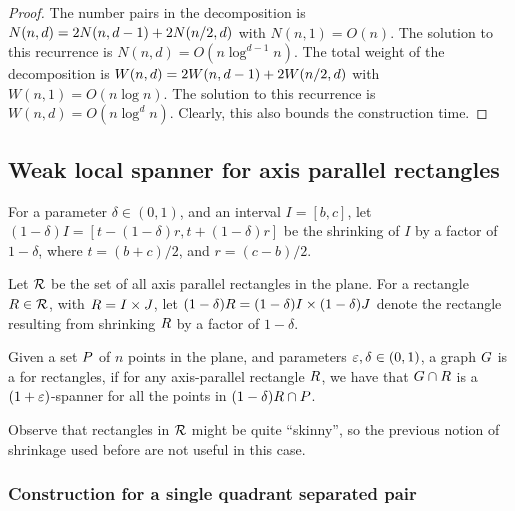 \documentclass[12pt]{article}%
\begin{document}
\begin{proof}
    The number pairs in the decomposition is
    \begin{math}
        N(n,d) = 2N(n,d-1) + 2N\pth{ n/2, d }
    \end{math}
    with $N(n,1) = O(n)$. The solution to this recurrence is
    $N(n,d) = O( n \log^{d-1} n)$.  The total weight of the
    decomposition is
    \begin{math}
        W(n,d) = 2W(n,d-1) + 2W\pth{ n/2, d }
    \end{math}
    with $W(n,1) = O(n \log n)$. The solution to this recurrence is
    $W(n,d) = O( n \log^{d} n)$. Clearly, this also bounds the
    construction time.
\end{proof}


\subsection{Weak local spanner for axis parallel rectangles}

For a parameter $\delta \in (0,1)$, and an interval $I = [b,c]$, let
$(1-\delta)I = [t - (1-\delta)r, t+ (1-\delta)r]$ be the shrinking of
$I$ by a factor of $1-\delta$, where $t = (b+c)/2$, and $r = (c-b)/2$.


Let $\mathcal{R}$ be the set of all axis parallel rectangles in the
plane. For a rectangle $R \in \mathcal{R}$, with $R = I \times J$,
let $(1-\delta)R = (1-\delta)I \times (1-\delta)J$ denote the
rectangle resulting from shrinking $R$ by a factor of $1-\delta$.

\begin{defn}
    Given a set $P$ of $n$ points in the plane, and parameters
    $\varepsilon, \delta \in (0,1)$, a graph $G$ is a
     for rectangles, if
    for any axis-parallel rectangle $R$, we have that
    $G \cap {R}$ is a $(1+\varepsilon)$-spanner for all the points
    in $(1-\delta)R \cap P$.
\end{defn}

Observe that rectangles in $\mathcal{R}$ might be quite ``skinny'', so the
previous notion of shrinkage used before are not useful in this case.

\subsubsection{Construction for a single quadrant separated pair}
\end{document}
